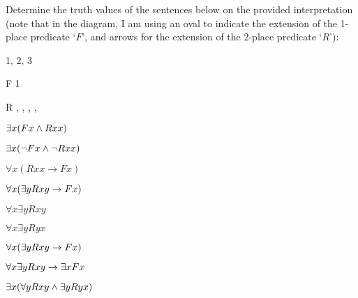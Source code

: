 \problempart Determine the truth values of the sentences below on the provided interpretation (note that in the diagram, I am using an oval to indicate the extension of the 1-place predicate `$F$', and arrows for the extension of the 2-place predicate `$R$'):\\


\begin{minipage}{\textwidth}
\begin{multicols}{2}

	\begin{ekey}
		\item[\text{Domain}] 1, 2, 3
		\item[F] 1
		\item[R] , , ,   , 
		
	\end{ekey}

\columnbreak
	
\end{multicols}
\end{minipage}




\begin{earg}

\item $\exists x(Fx \wedge Rxx)$
\item $\exists x(\neg Fx \wedge \neg Rxx)$
\item $\forall x(Rxx \rightarrow Fx)$
\item $\forall x(\exists yRxy \rightarrow Fx)$
\item $\forall x\exists y Rxy$
\item $\forall x\exists y Ryx$ 
\item $\forall x(\exists yRxy \rightarrow Fx)$
\item $\forall x\exists yRxy \rightarrow \exists xFx$
\item $\exists x(\forall y Rxy \wedge \exists yRyx)$

\end{earg}




